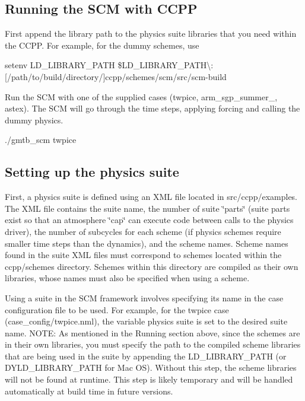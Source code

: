 \subsection*{Running the S\+CM with C\+C\+PP}


\begin{DoxyEnumerate}
\item First append the library path to the physics suite libraries that you need within the C\+C\+PP. For example, for the dummy schemes, use
\end{DoxyEnumerate}
\begin{DoxyItemize}
\item {\ttfamily setenv L\+D\+\_\+\+L\+I\+B\+R\+A\+R\+Y\+\_\+\+P\+A\+TH \$\+L\+D\+\_\+\+L\+I\+B\+R\+A\+R\+Y\+\_\+\+P\+A\+TH\textbackslash{}\+:\mbox{[}/path/to/build/directory/\mbox{]}ccpp/schemes/scm/src/scm-\/build}
\end{DoxyItemize}
\begin{DoxyEnumerate}
\item Run the S\+CM with one of the supplied cases (twpice, arm\+\_\+sgp\+\_\+summer\+\_, astex). The S\+CM will go through the time steps, applying forcing and calling the dummy physics.
\end{DoxyEnumerate}
\begin{DoxyItemize}
\item {\ttfamily ./gmtb\+\_\+scm twpice}
\end{DoxyItemize}

\subsection*{Setting up the physics suite}

First, a physics suite is defined using an X\+ML file located in src/ccpp/examples. The X\+ML file contains the suite name, the number of suite \char`\"{}parts\char`\"{} (suite parts exist so that an atmosphere \char`\"{}cap\char`\"{} can execute code between calls to the physics driver), the number of subcycles for each scheme (if physics schemes require smaller time steps than the dynamics), and the scheme names. Scheme names found in the suite X\+ML files must correspond to schemes located within the ccpp/schemes directory. Schemes within this directory are compiled as their own libraries, whose names must also be specified when using a scheme.

Using a suite in the S\+CM framework involves specifying its name in the case configuration file to be used. For example, for the twpice case (case\+\_\+config/twpice.\+nml), the variable \textquotesingle{}physics suite\textquotesingle{} is set to the desired suite name. N\+O\+TE\+: As mentioned in the \textquotesingle{}Running\textquotesingle{} section above, since the schemes are in their own libraries, you must specify the path to the compiled scheme libraries that are being used in the suite by appending the L\+D\+\_\+\+L\+I\+B\+R\+A\+R\+Y\+\_\+\+P\+A\+TH (or D\+Y\+L\+D\+\_\+\+L\+I\+B\+R\+A\+R\+Y\+\_\+\+P\+A\+TH for Mac OS). Without this step, the scheme libraries will not be found at runtime. This step is likely temporary and will be handled automatically at build time in future versions.

